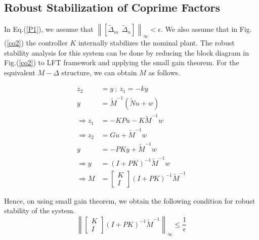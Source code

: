 \documentclass[a4paper,12pt]{article}
\newcommand\norm[1]{\left\lVert#1\right\rVert}
\begin{document}
	\subsection{Robust Stabilization of Coprime Factors} In Eq.(\ref{P1}), we assume that $\norm{[\tilde{\Delta}_{m} \:\: \tilde{\Delta}_{n}]}_{\infty} < \epsilon$. We also assume that in Fig.(\ref{co2}) the controller $K$ internally stabilizes the nominal plant. The robust stability analysis for this system can be done by reducing the block diagram in Fig.(\ref{co2}) to LFT framework and applying the small gain theorem. For the equivalent $M-\Delta$ structure, we can obtain $M$ as follows.
	
	
	\begin{align*}
	z_{2}&=y \: ; \: z_{1} = -ky \\
	y&=\tilde{M}^{-1}(\tilde{N}u + w)\\
	\Rightarrow z_{1} &= -KPu-K\tilde{M}^{-1}w\\
	\Rightarrow z_{2} &= Gu + \tilde{M}^{-1}w\\
	y&=-PKy+\tilde{M}^{-1}w\\
	\Rightarrow y&=(I+PK)^{-1}\tilde{M}^{-1}w\\
	\Rightarrow M&=\begin{bmatrix}
	K \\ I
	\end{bmatrix}
	(I+PK)^{-1}\tilde{M}^{-1}
	\end{align*}	 
	
	Hence, on using small gain theorem, we obtain the following condition for robust stability of the system.
	\begin{equation}
	\norm{\begin{bmatrix}
	K \\ I
	\end{bmatrix}
	(I+PK)^{-1}\tilde{M}^{-1}}_{\infty} \leq \frac{1}{\epsilon}	
	\end{equation}
	
\end{document}
